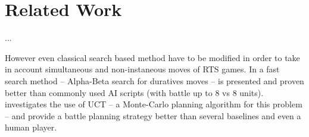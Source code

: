 \section{Related Work}
...

However even classical search based method have to be modified in order to take in account simultaneous and non-instaneous moves of RTS games.
In \cite{abcd} a fast search method -- Alpha-Beta search for duratives moves -- is presented and proven better than commonly used AI scripts (with battle up to 8 vs 8 units). 
\cite{wargusuct} investigates the use of UCT -- a Monte-Carlo planning algorithm for this problem -- and provide a battle planning strategy better than several baselines and even a human player.
